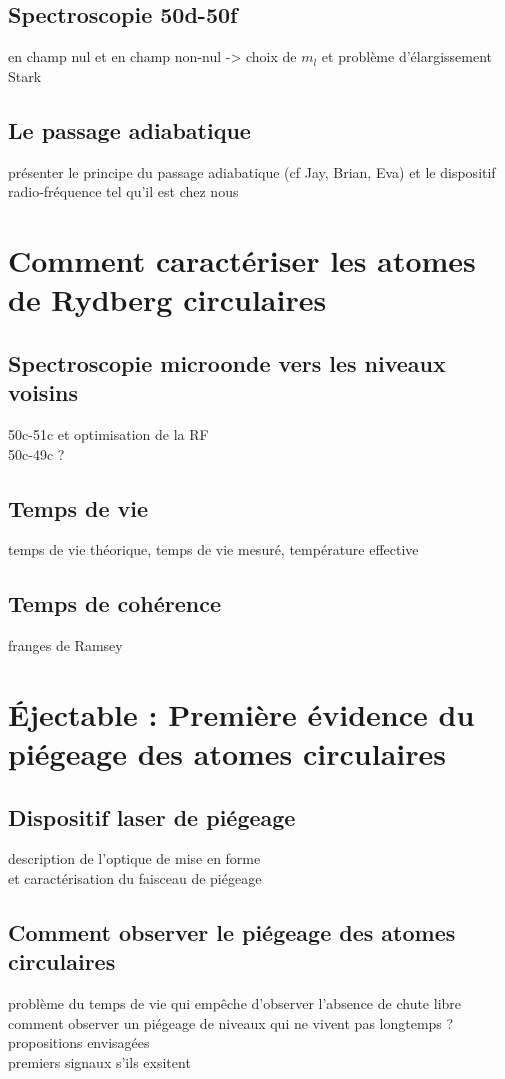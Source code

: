 	\subsection{Spectroscopie 50d-50f}
		\noindent en champ nul et en champ non-nul -> choix de $m_l$ et problème d'élargissement Stark
	\subsection*{Le passage adiabatique}
		\noindent présenter le principe du passage adiabatique (cf Jay, Brian, Eva) et le dispositif radio-fréquence tel qu'il est chez nous

\section{Comment caractériser les atomes de Rydberg circulaires}
	\subsection{Spectroscopie microonde vers les niveaux voisins}
		\noindent 50c-51c et optimisation de la RF\\
		\noindent 50c-49c ?
	\subsection{Temps de vie}
		\noindent temps de vie théorique, temps de vie mesuré, température effective
	\subsection{Temps de cohérence}
		\noindent franges de Ramsey
	


\section{Éjectable : Première évidence du piégeage des atomes circulaires}
	\subsection{Dispositif laser de piégeage}
		\noindent description de l'optique de mise en forme \\
		et caractérisation du faisceau de piégeage
	\subsection{Comment observer le piégeage des atomes circulaires}
		\noindent problème du temps de vie qui empêche d'observer l'absence de chute libre \\
		\noindent comment observer un piégeage de niveaux qui ne vivent pas longtemps ? propositions envisagées\\
		premiers signaux s'ils exsitent
